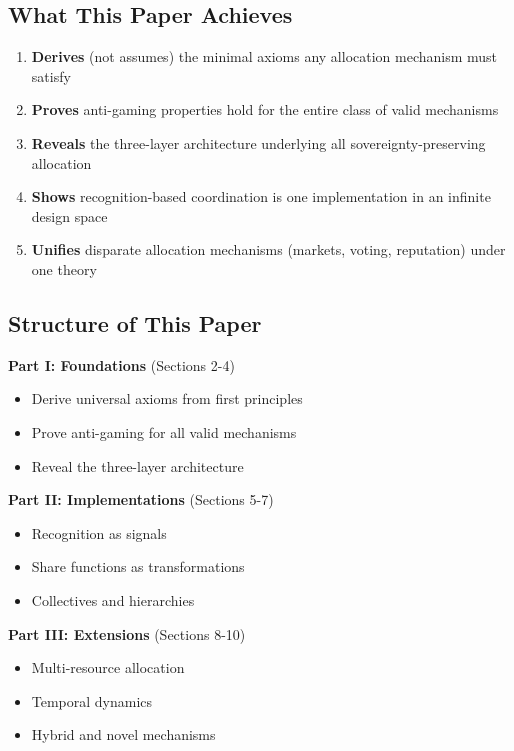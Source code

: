 \documentclass[11pt,a4paper]{article}
\theoremstyle{definition}
\theoremstyle{remark}
\begin{document}
\subsection{What This Paper Achieves}

\begin{enumerate}
\item \textbf{Derives} (not assumes) the minimal axioms any allocation mechanism must satisfy
\item \textbf{Proves} anti-gaming properties hold for the entire class of valid mechanisms
\item \textbf{Reveals} the three-layer architecture underlying all sovereignty-preserving allocation
\item \textbf{Shows} recognition-based coordination is one implementation in an infinite design space
\item \textbf{Unifies} disparate allocation mechanisms (markets, voting, reputation) under one theory
\end{enumerate}

\subsection{Structure of This Paper}

\textbf{Part I: Foundations} (Sections 2-4)
\begin{itemize}
\item Derive universal axioms from first principles
\item Prove anti-gaming for all valid mechanisms
\item Reveal the three-layer architecture
\end{itemize}

\textbf{Part II: Implementations} (Sections 5-7)
\begin{itemize}
\item Recognition as signals
\item Share functions as transformations
\item Collectives and hierarchies
\end{itemize}

\textbf{Part III: Extensions} (Sections 8-10)
\begin{itemize}
\item Multi-resource allocation
\item Temporal dynamics
\item Hybrid and novel mechanisms
\end{itemize}
\end{document}
